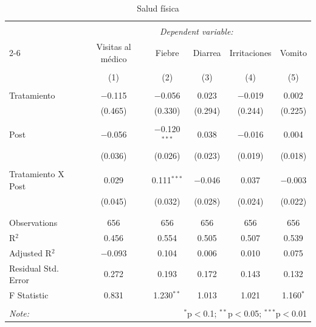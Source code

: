 
\begin{table}[H] \centering 
  \caption{Salud física} 
  \label{reg_fisico} 
\tiny 
\begin{tabular}{@{\extracolsep{-7pt}}lccccc} 
\\[-1.8ex]\hline 
\hline \\[-1.8ex] 
 & \multicolumn{5}{c}{\textit{Dependent variable:}} \\ 
\cline{2-6} 
 & Visitas al médico & Fiebre & Diarrea & Irritaciones & Vomito \\ 
\\[-1.8ex] & (1) & (2) & (3) & (4) & (5)\\ 
\hline \\[-1.8ex] 
 Tratamiento & $-$0.115 & $-$0.056 & 0.023 & $-$0.019 & 0.002 \\ 
  & (0.465) & (0.330) & (0.294) & (0.244) & (0.225) \\ 
  & & & & & \\ 
 Post & $-$0.056 & $-$0.120$^{***}$ & 0.038 & $-$0.016 & 0.004 \\ 
  & (0.036) & (0.026) & (0.023) & (0.019) & (0.018) \\ 
  & & & & & \\ 
 Tratamiento X Post & 0.029 & 0.111$^{***}$ & $-$0.046 & 0.037 & $-$0.003 \\ 
  & (0.045) & (0.032) & (0.028) & (0.024) & (0.022) \\ 
  & & & & & \\ 
\hline \\[-1.8ex] 
Observations & 656 & 656 & 656 & 656 & 656 \\ 
R$^{2}$ & 0.456 & 0.554 & 0.505 & 0.507 & 0.539 \\ 
Adjusted R$^{2}$ & $-$0.093 & 0.104 & 0.006 & 0.010 & 0.075 \\ 
Residual Std. Error & 0.272 & 0.193 & 0.172 & 0.143 & 0.132 \\ 
F Statistic & 0.831 & 1.230$^{**}$ & 1.013 & 1.021 & 1.160$^{*}$ \\ 
\hline 
\hline \\[-1.8ex] 
\textit{Note:}  & \multicolumn{5}{r}{$^{*}$p$<$0.1; $^{**}$p$<$0.05; $^{***}$p$<$0.01} \\ 
\end{tabular} 
\end{table} 
